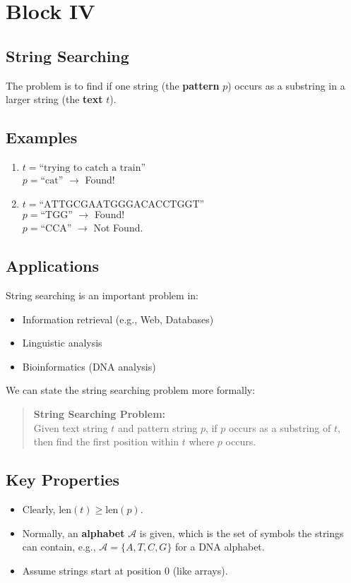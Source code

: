 \documentclass[a4paper,12pt]{article}
\begin{document}
\section{Block IV}

\subsection{String Searching}

The problem is to find if one string (the \textbf{pattern} \(p\)) occurs as a substring in a larger string (the \textbf{text} \(t\)).

\subsection*{Examples}
\begin{enumerate}
    \item \(t = \text{``trying to catch a train''}\)\\
          \(p = \text{``cat''}\) \(\rightarrow\) Found!
    \item \(t = \text{``ATTGCGAATGGGACACCTGGT''}\)\\
          \(p = \text{``TGG''}\) \(\rightarrow\) Found!\\
          \(p = \text{``CCA''}\) \(\rightarrow\) Not Found.
\end{enumerate}

\subsection*{Applications}
String searching is an important problem in:
\begin{itemize}
    \item Information retrieval (e.g., Web, Databases)
    \item Linguistic analysis
    \item Bioinformatics (DNA analysis)
\end{itemize}

We can state the string searching problem more formally:

\begin{quote}
    \textbf{String Searching Problem:} \\
    Given text string \(t\) and pattern string \(p\), if \(p\) occurs as a substring of \(t\), then find the first position within \(t\) where \(p\) occurs.
\end{quote}

\subsection*{Key Properties}
\begin{itemize}
    \item Clearly, \(\text{len}(t) \geq \text{len}(p)\).
    \item Normally, an \textbf{alphabet} \(\mathcal{A}\) is given, which is the set of symbols the strings can contain, e.g., \(\mathcal{A} = \{A, T, C, G\}\) for a DNA alphabet.
    \item Assume strings start at position \(0\) (like arrays).
\end{itemize}
\end{document}

